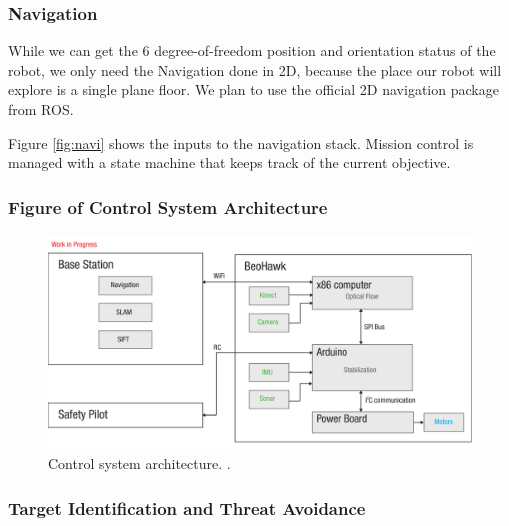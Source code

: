 \documentclass[12pt, letterpaper]{article}
\begin{document}

\subsubsection{Navigation}

While we can get the 6 degree-of-freedom position and orientation status of the robot, we only need the Navigation done in 2D, because the place our robot will explore is a single plane floor. We plan to use the official 2D navigation package from ROS.



Figure \eqref{fig:navi} shows the inputs to the navigation stack. Mission control is managed with a state machine that keeps track of the current objective.  

\subsubsection{Figure of Control System Architecture}

\begin{figure}[h]
\centering
\includegraphics[width=14cm]{images/beohawk-system-arch.pdf}
\caption{Control system architecture. .} 
\label{fig:architecture}
\end{figure}


\subsubsection{Target Identification and Threat Avoidance}
\end{document}
